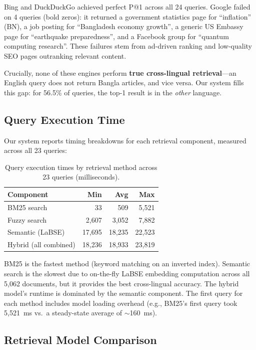 \documentclass[12pt,a4paper]{article}
\begin{document}
Bing and DuckDuckGo achieved perfect P@1 across all 24 queries. Google failed on 4 queries (bold zeros): it returned a government statistics page for ``inflation'' (BN), a job posting for ``Bangladesh economy growth'', a generic US Embassy page for ``earthquake preparedness'', and a Facebook group for ``quantum computing research''. These failures stem from ad-driven ranking and low-quality SEO pages outranking relevant content.

Crucially, none of these engines perform \textbf{true cross-lingual retrieval}---an English query does not return Bangla articles, and vice versa. Our system fills this gap: for 56.5\% of queries, the top-1 result is in the \textit{other} language.


\subsection{Query Execution Time}

Our system reports timing breakdowns for each retrieval component, measured across all 23 queries:

\begin{table}[H]
\centering
\caption{Query execution times by retrieval method across 23 queries (milliseconds).}
\label{tab:timing}
\begin{tabular}{lrrr}
\toprule
\textbf{Component} & \textbf{Min} & \textbf{Avg} & \textbf{Max} \\
\midrule
BM25 search          & 33    & 509   & 5{,}521  \\
Fuzzy search          & 2{,}607 & 3{,}052 & 7{,}882  \\
Semantic (LaBSE)      & 17{,}695 & 18{,}235 & 22{,}523 \\
Hybrid (all combined) & 18{,}236 & 18{,}933 & 23{,}819 \\
\bottomrule
\end{tabular}
\end{table}

BM25 is the fastest method (keyword matching on an inverted index). Semantic search is the slowest due to on-the-fly LaBSE embedding computation across all 5{,}062 documents, but it provides the best cross-lingual accuracy. The hybrid model's runtime is dominated by the semantic component. The first query for each method includes model loading overhead (e.g., BM25's first query took 5{,}521~ms vs.\ a steady-state average of $\sim$160~ms).


\subsection{Retrieval Model Comparison}
\end{document}
